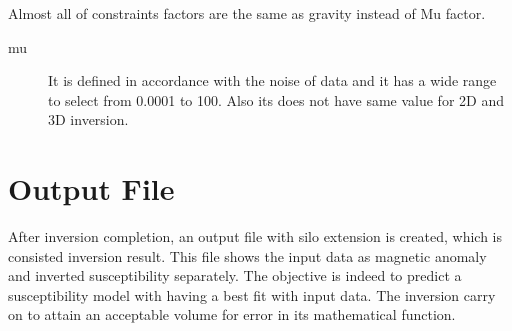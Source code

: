 Almost all of constraints factors are the same as gravity instead of Mu factor.\\

\begin{description} 	

\item[mu]
It is defined in accordance with the noise of data and it has a wide range to select from 0.0001 to 100. Also its does not have same value for 2D and 3D inversion.

\end{description}

\section{Output File}
After inversion completion, an output file with silo extension is created, which is consisted inversion result. This file shows the input data as magnetic anomaly and inverted susceptibility separately. The objective is indeed to  predict a susceptibility model with having a best fit with input data. The inversion carry on to attain an acceptable volume for error in its mathematical function. 



